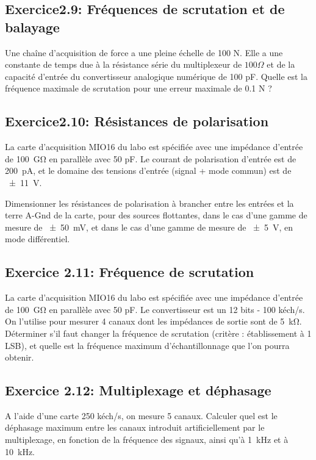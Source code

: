 \documentclass[main.tex]{subfiles}
\begin{document}
\subsection*{Exercice2.9: Fréquences de scrutation et de balayage}
Une chaîne d’acquisition de force a une pleine échelle de 100 N. Elle a une constante de
temps due à la résistance série du multiplexeur de $100 \Omega $ et de la capacité d’entrée du
convertisseur analogique numérique de 100 pF. Quelle est la fréquence maximale de 
scrutation pour une erreur maximale de 0.1 N ?



\subsection*{Exercice2.10: Résistances de polarisation}
La carte d'acquisition MIO16 du labo est spécifiée avec une impédance d'entrée de \SI{100}{\giga\ohm} en parallèle avec 50 pF. Le courant de polarisation d'entrée est de \SI{200}{\pico\ampere}, et le domaine des tensions d'entrée (signal + mode commun) est de \SI{\pm11}{\volt}.

Dimensionner les résistances de polarisation à brancher entre les entrées et la terre A-Gnd de la carte, pour des sources flottantes, dans le cas d'une gamme de mesure de \SI{\pm50}{\milli\volt}, et dans le cas d'une gamme de mesure de \SI{\pm5}{\volt}, en mode différentiel.

\subsection*{Exercice 2.11: Fréquence de scrutation}
La carte d'acquisition MIO16 du labo est spécifiée avec une impédance d'entrée de \SI{100}{\giga\ohm} en parallèle avec 50 pF. Le convertisseur est un 12 bits - 100 kéch/s. On l'utilise pour mesurer 4 canaux dont les impédances de sortie sont de \SI{5}{\kilo\ohm}. Déterminer s'il faut changer la fréquence de scrutation (critère : établissement à 1 LSB), et quelle est la fréquence maximum d'échantillonnage que l'on pourra obtenir.

\subsection*{Exercice 2.12: Multiplexage et déphasage}
A l'aide d'une carte 250 kéch/s, on mesure 5 canaux. Calculer quel est le déphasage maximum entre les canaux introduit artificiellement par le multiplexage, en fonction de la fréquence des signaux, ainsi qu'à \SI{1}{\kilo\hertz} et à \SI{10}{\kilo\hertz}.

\fi
\end{document}
